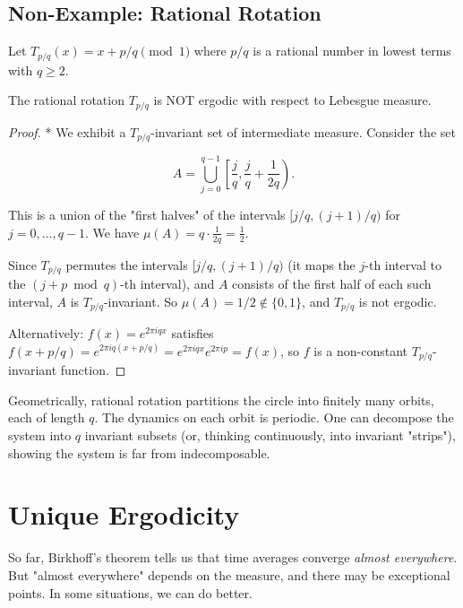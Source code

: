 \subsection{Non-Example: Rational Rotation}\label{sec:9.7.4}

Let $T_{p/q}(x) = x + p/q \pmod{1}$ where $p/q$ is a rational number in lowest terms with $q \geq 2$.

\begin{proposition}\label{prop:9.19.}
The rational rotation $T_{p/q}$ is NOT ergodic with respect to Lebesgue measure.
\end{proposition}


\begin{proof}
* We exhibit a $T_{p/q}$-invariant set of intermediate measure. Consider the set

\[
A = \bigcup_{j=0}^{q-1} \left[\frac{j}{q}, \frac{j}{q} + \frac{1}{2q}\right).
\]

This is a union of the "first halves" of the intervals $[j/q, (j+1)/q)$ for $j = 0, \ldots, q-1$. We have $\mu(A) = q \cdot \frac{1}{2q} = \frac{1}{2}$.

Since $T_{p/q}$ permutes the intervals $[j/q, (j+1)/q)$ (it maps the $j$-th interval to the $(j+p \bmod q)$-th interval), and $A$ consists of the first half of each such interval, $A$ is $T_{p/q}$-invariant. So $\mu(A) = 1/2 \notin \{0, 1\}$, and $T_{p/q}$ is not ergodic.

Alternatively: $f(x) = e^{2\pi i q x}$ satisfies $f(x + p/q) = e^{2\pi i q(x + p/q)} = e^{2\pi i qx} e^{2\pi i p} = f(x)$, so $f$ is a non-constant $T_{p/q}$-invariant function.
\end{proof}


\begin{remark}
Geometrically, rational rotation partitions the circle into finitely many orbits, each of length $q$. The dynamics on each orbit is periodic. One can decompose the system into $q$ invariant subsets (or, thinking continuously, into invariant "strips"), showing the system is far from indecomposable.
\end{remark}


\section{Unique Ergodicity}\label{sec:9.8}

So far, Birkhoff's theorem tells us that time averages converge \textit{almost everywhere}. But "almost everywhere" depends on the measure, and there may be exceptional points. In some situations, we can do better.

